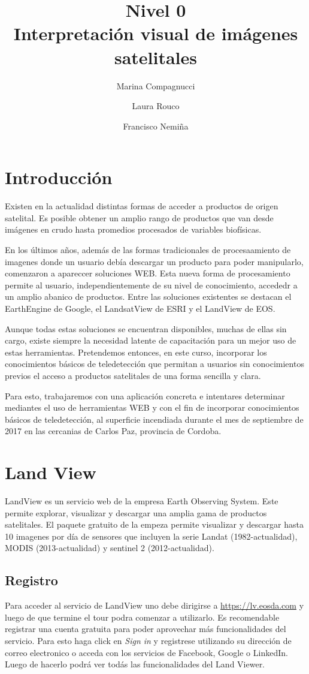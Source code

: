 \documentclass[a4paper,12pt]{book}
\title{{\large Nivel 0} \\ Interpretación visual de imágenes satelitales}
\author{Marina Compagnucci \and Laura Rouco \and Francisco Nemiña}
\begin{document}
\maketitle
\titlepage

\chapter{Introducción}
Existen en la actualidad distintas formas de acceder a productos de origen satelital. Es posible obtener un amplio rango de productos que van desde imágenes en crudo hasta promedios procesados de variables biofísicas.

En los últimos años, además de las formas tradicionales de procesaamiento de imagenes donde un usuario debía descargar un producto para poder manipularlo, comenzaron a apareccer soluciones WEB. Esta nueva forma de procesamiento permite al usuario, independientemente de su nivel de conocimiento, accededr a un amplio abanico de productos. Entre las soluciones existentes se destacan el EarthEngine de Google, el LandsatView de ESRI y el LandView de EOS.

Aunque todas estas soluciones se encuentran disponibles, muchas de ellas sin cargo, existe siempre la necesidad latente de capacitación para un mejor uso de estas herramientas. Pretendemos entonces, en este curso, incorporar los conocimientos básicos de teledetección que permitan a usuarios sin conocimientos previos el acceso a productos satelitales de una forma sencilla y clara.

Para esto, trabajaremos con una aplicación concreta e intentares determinar mediantes el uso de herramientas WEB y con el fin de incorporar conocimientos básicos de teledetección, al superficie incendiada durante el mes de septiembre de 2017 en las cercanias de Carlos Paz, provincia de Cordoba.

\chapter{Land View}

LandView es un servicio web de la empresa Earth Observing System. Este permite explorar, visualizar y descargar una amplia gama de productos satelitales. El paquete gratuito de la empeza permite visualizar y descargar hasta 10 imagenes por día de sensores que incluyen la serie Landat (1982-actualidad), MODIS (2013-actualidad) y sentinel 2 (2012-actualidad).

\section{Registro}
Para acceder al servicio de LandView uno debe dirigirse a \url{https://lv.eosda.com} y luego de que termine el tour podra comenzar a utilizarlo. Es recomendable registrar una cuenta gratuita para poder aprovechar más funcionalidades del servicio. Para esto haga click en \emph{Sign in} y registrese utilizando su dirección de correo electronico o acceda con los servicios de Facebook, Google o LinkedIn. Luego de hacerlo podrá ver todás las funcionalidades del Land Viewer.
\end{document}
